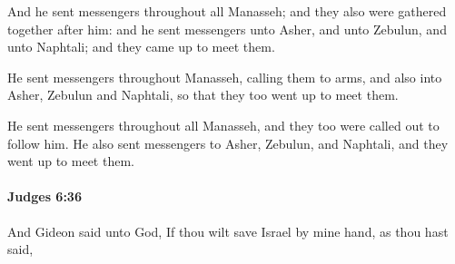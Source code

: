 			\begin{versebox}
					\item[BHS] 
					\item[ASV] And he sent messengers throughout all Manasseh; and they also were gathered together after him: and he sent messengers unto Asher, and unto Zebulun, and unto Naphtali; and they came up to meet them.
					\item[NIV] He sent messengers throughout Manasseh, calling them to arms, and also into Asher, Zebulun and Naphtali, so that they too went up to meet them.
					\item[NRSV] He sent messengers throughout all Manasseh, and they too were called out to follow him. He also sent messengers to Asher, Zebulun, and Naphtali, and they went up to meet them.
			\end{versebox}

		\paragraph{Judges 6:36} %
			\label{JUDGES-6-36}

			And Gideon said unto God, If thou wilt save Israel by mine hand, as thou hast said,

